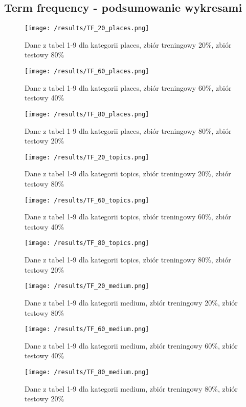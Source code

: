 \documentclass{classrep}
\begin{document}
\subsection{Term frequency - podsumowanie wykresami}
\begin{figure}[H]
	\centering
	\texttt{[image: /results/TF\_20\_places.png]}
	\caption{Dane z tabel 1-9 dla kategorii places, zbiór treningowy 20\%, zbiór testowy 80\%}
\end{figure}
\begin{figure}[H]
	\centering
	\texttt{[image: /results/TF\_60\_places.png]}
	\caption{Dane z tabel 1-9 dla kategorii places, zbiór treningowy 60\%, zbiór testowy 40\%}
\end{figure}
\begin{figure}[H]
	\centering
	\texttt{[image: /results/TF\_80\_places.png]}
	\caption{Dane z tabel 1-9 dla kategorii places, zbiór treningowy 80\%, zbiór testowy 20\%}
\end{figure}
\begin{figure}[H]
	\centering
	\texttt{[image: /results/TF\_20\_topics.png]}
	\caption{Dane z tabel 1-9 dla kategorii topics, zbiór treningowy 20\%, zbiór testowy 80\%}
\end{figure}
\begin{figure}[H]
	\centering
	\texttt{[image: /results/TF\_60\_topics.png]}
	\caption{Dane z tabel 1-9 dla kategorii topics, zbiór treningowy 60\%, zbiór testowy 40\%}
\end{figure}
\begin{figure}[H]
	\centering
	\texttt{[image: /results/TF\_80\_topics.png]}
	\caption{Dane z tabel 1-9 dla kategorii topics, zbiór treningowy 80\%, zbiór testowy 20\%}
\end{figure}
\begin{figure}[H]
	\centering
	\texttt{[image: /results/TF\_20\_medium.png]}
	\caption{Dane z tabel 1-9 dla kategorii medium, zbiór treningowy 20\%, zbiór testowy 80\%}
\end{figure}
\begin{figure}[H]
	\centering
	\texttt{[image: /results/TF\_60\_medium.png]}
	\caption{Dane z tabel 1-9 dla kategorii medium, zbiór treningowy 60\%, zbiór testowy 40\%}
\end{figure}
\begin{figure}[H]
	\centering
	\texttt{[image: /results/TF\_80\_medium.png]}
	\caption{Dane z tabel 1-9 dla kategorii medium, zbiór treningowy 80\%, zbiór testowy 20\%}
\end{figure}
\end{document}
